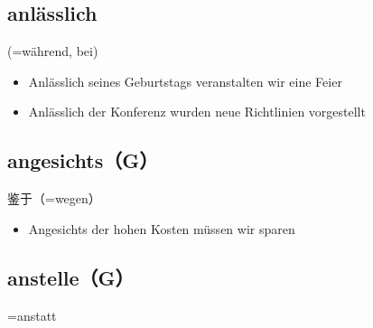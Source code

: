\documentclass[UTF8]{report}
\begin{document}
\subsection{anlässlich}
(=während, bei)
\begin{itemize}
    \item Anlässlich seines Geburtstags veranstalten wir eine Feier
    \item Anlässlich der Konferenz wurden neue Richtlinien vorgestellt
\end{itemize}

\subsection{angesichts（G）}
鉴于（=wegen）
\begin{itemize}
    \item Angesichts der hohen Kosten müssen wir sparen
\end{itemize}

\subsection{anstelle（G）}
=anstatt
\end{document}
